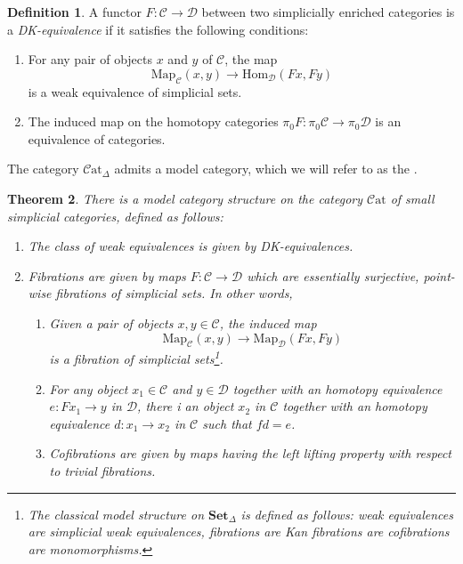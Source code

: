 \documentclass[a4paper,11pt]{article}
\newcommand{\Hom}{\mathrm{Hom}}
\newcommand{\ccal}{\mathcal{C}}
\newcommand{\dcal}{\mathcal{D}}
\newcommand{\sets}{\mathbf{Set}}
\theoremstyle{plain}
\newtheorem{thm}{Theorem}[section]
\theoremstyle{definition}
\newtheorem{defi}[thm]{Definition}
\theoremstyle{remark}
\begin{document}
\begin{defi}
A functor $F \colon \ccal \to \dcal$ between two simplicially enriched categories is a \textit{DK-equivalence} if it satisfies the following conditions: 
\begin{enumerate}[label = \arabic*)]
    \item For any pair of objects $x$ and $y$ of $\ccal$, the map 
    $$\text{Map}_{\ccal}(x,y) \to \Hom_{\dcal}(Fx, Fy)$$
    is a weak equivalence of simplicial sets.
    \item The induced map on the homotopy categories $\pi_0 F \colon \pi_0 \ccal \to \pi_0 \dcal$ is an equivalence of categories. 
\end{enumerate}
\end{defi}


The category $\ccal \text{at}_{\Delta}$ admits a model category, which we will refer to as the . 

\begin{thm}
There is a model category structure on the category $\ccal \text{at}$ of small simplicial categories, defined as follows:
\begin{enumerate}[label = \arabic*)]
    \item The class of weak equivalences is given by DK-equivalences. 
    \item Fibrations are given by maps $F \colon \ccal \to \dcal$ which are essentially surjective, point-wise fibrations of simplicial sets. In other words, 
    \begin{enumerate}[label = \roman*)]
        \item Given a pair of objects $x, y \in \ccal$, the induced map 
        $$\text{Map}_{\ccal}(x,y) \to \text{Map}_{\dcal}(Fx, Fy)$$
        is a fibration of simplicial sets\footnote{The \textit{classical model structure on $\sets_{\Delta}$} is defined as follows: weak equivalences are simplicial weak equivalences, fibrations are Kan fibrations are cofibrations are monomorphisms. }. 
        \item For any object $x_1 \in \ccal$ and $y \in \dcal$ together with an homotopy equivalence $e \colon Fx_1 \to y$ in $\dcal$, there i an object $x_2$ in $\ccal$ together with an homotopy equivalence $d \colon x_1 \to x_2$ in $\ccal$ such that $f d = e$. 
        \item Cofibrations are given by maps having the left lifting property with respect to trivial fibrations. 
    \end{enumerate}
\end{enumerate}
\end{thm}
\end{document}
